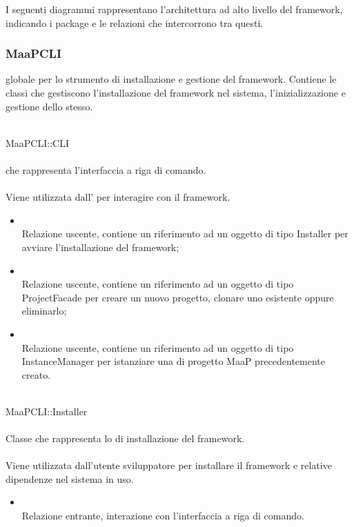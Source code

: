 I seguenti diagrammi rappresentano l'architettura ad alto livello del framework, indicando i package e le relazioni che intercorrono tra questi.

\subsubsection{MaaPCLI}
 globale per lo strumento di installazione e gestione del framework. Contiene le classi che gestiscono l'installazione del framework nel sistema, l'inizializzazione e gestione dello stesso.


\\
MaaPCLI::CLI\\
\\
 che rappresenta l'interfaccia a riga di comando.\\
\\
Viene utilizzata dall' per interagire con il framework.\\
\begin{itemize}
\item{}\\
Relazione uscente, contiene un riferimento ad un oggetto di tipo Installer per avviare l'installazione del framework;
\item{}\\
Relazione uscente, contiene un riferimento ad un oggetto di tipo ProjectFacade per creare un nuovo progetto, clonare uno esistente oppure eliminarlo;
\item{}\\
Relazione uscente, contiene un riferimento ad un oggetto di tipo InstanceManager per istanziare una  di progetto MaaP precedentemente creato.
\end{itemize}

\\
MaaPCLI::Installer\\
\\
Classe che rappresenta lo  di installazione del framework.\\
\\
Viene utilizzata dall'utente sviluppatore per installare il framework e relative dipendenze nel sistema in uso.\\
\begin{itemize}
\item{}\\
Relazione entrante, interazione con l'interfaccia a riga di comando.
\end{itemize}

